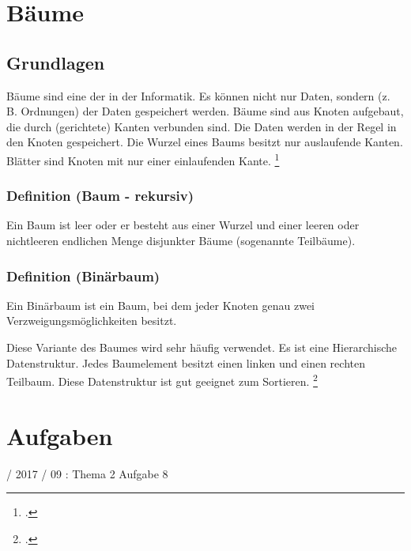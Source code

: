 \documentclass{lehramt-informatik-haupt}
\begin{document}

\chapter{Bäume}

\section{Grundlagen}

\begin{quellen}
\item \cite[Kapitel 6.2.2.3, Seite 186]{schneider}
\item \cite[Seite 345-419]{saake}
\end{quellen}

Bäume sind eine der  in
der Informatik. Es können nicht nur Daten, sondern (z. B. Ordnungen) der Daten gespeichert werden. Bäume sind
aus Knoten aufgebaut, die durch (gerichtete) Kanten verbunden sind. Die
Daten werden in der Regel in den Knoten gespeichert. Die Wurzel eines
Baums besitzt nur auslaufende Kanten. Blätter sind Knoten mit nur einer
einlaufenden Kante.
\footcite[Seite 2]{aud:fs:5}

%

\subsection{Definition (Baum - rekursiv)}

Ein Baum ist leer oder er besteht aus einer Wurzel und einer leeren oder
nichtleeren endlichen Menge disjunkter Bäume (sogenannte Teilbäume).

%

\subsection{Definition (Binärbaum)}

Ein Binärbaum ist ein Baum, bei dem jeder Knoten genau zwei
Verzweigungsmöglichkeiten besitzt.

Diese Variante des Baumes wird sehr häufig verwendet. Es ist eine
Hierarchische Datenstruktur. Jedes Baumelement besitzt einen linken und
einen rechten Teilbaum. Diese Datenstruktur ist gut geeignet zum
Sortieren.
\footcite[Seite 3]{aud:fs:5}


\chapter{Aufgaben}

%

 / 2017 / 09 : Thema 2 Aufgabe 8

\literatur
\end{document}
